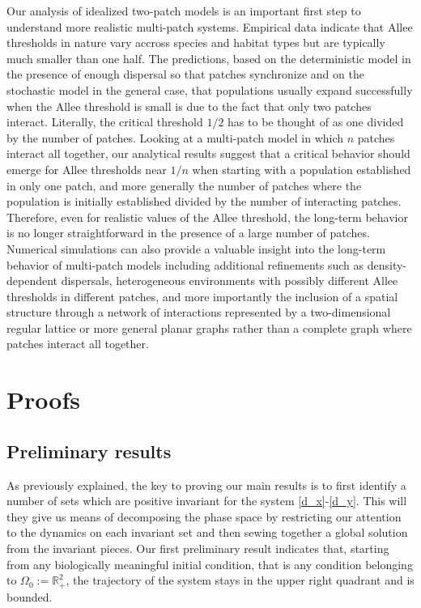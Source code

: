 \indent Our analysis of idealized two-patch models is an important first step to understand more realistic multi-patch systems.
 Empirical data indicate that Allee thresholds in nature vary accross species and habitat types but are typically much smaller
 than one half.
 The predictions, based on the deterministic model in the presence of enough dispersal so that patches synchronize and on the
 stochastic model in the general case, that populations usually expand successfully when the Allee threshold is small is due
 to the fact that only two patches interact.
 Literally, the critical threshold $1/2$ has to be thought of as one divided by the number of patches.
 Looking at a multi-patch model in which $n$ patches interact all together, our analytical results suggest that a critical
 behavior should emerge for Allee thresholds near $1/n$ when starting with a population established in only one patch, and more
 generally the number of patches where the population is initially established divided by the number of interacting patches.
 Therefore, even for realistic values of the Allee threshold, the long-term behavior is no longer straightforward in the presence
 of a large number of patches.
 Numerical simulations can also provide a valuable insight into the long-term behavior of multi-patch models including additional
 refinements such as density-dependent dispersals, heterogeneous environments with possibly
 different Allee thresholds in different patches, and more importantly the inclusion of a spatial structure through a
 network of interactions represented by a two-dimensional regular lattice or more general planar graphs rather than a complete
 graph where patches interact all together.

\section{ Proofs}
\label{sec:proofs}

\subsection*{Preliminary results}

\noindent As previously explained, the key to proving our main results is to first identify a number of sets which are positive
 invariant for the system \eqref{d_x}-\eqref{d_y}.
 This will they give us means of decomposing the phase space by restricting our attention to the dynamics on each invariant set
 and then sewing together a global solution from the invariant pieces.
 Our first preliminary result indicates that, starting from any biologically meaningful initial condition, that is any condition
 belonging to $\Omega_0 := {{\mathbb{R}}}_+^2$, the trajectory of the system stays in the upper right quadrant and is bounded.

